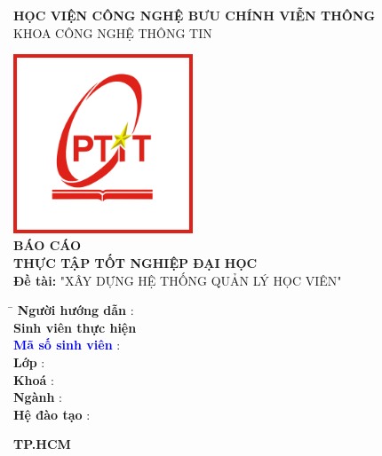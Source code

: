 \documentclass[report.tex]{subfiles}
\begin{document}
\begin{titlepage}

\begin{center}
    \textbf{HỌC VIỆN CÔNG NGHỆ BƯU CHÍNH VIỄN THÔNG}\\
    KHOA CÔNG NGHỆ THÔNG TIN\\
    \vspace{1cm}
    \vspace{-8pt}\hrulefill\raisebox{-2.1pt}\quad\decofourleft\decotwo\decofourright\quad\hrulefill

    \vspace{2cm}
    \centering\includegraphics[width=0.4\textwidth]{../meta/logo.PTIT.png}\\
    \vspace{2cm}
    \textbf{\Huge BÁO CÁO\\
        THỰC TẬP TỐT NGHIỆP ĐẠI HỌC}\\
    \vspace{1cm}
    \textbf{\Large Đề tài:} {\large "XÂY DỰNG HỆ THỐNG QUẢN LÝ HỌC VIÊN"} \\

    \vfill

    \begin{tabbing}
        \hspace{8cm} \= \hspace{10cm} \kill
        \textbf{Người hướng dẫn} \> :  \\
        \textbf{Sinh viên thực hiện} \> \\
        \textbf{\textcolor{blue}{Mã số sinh viên}} \> : \\
        \textbf{Lớp} \> : \\
        \textbf{Khoá} \> : \\
        \textbf{Ngành} \> : \\
        \textbf{Hệ đào tạo} \> : \\
    \end{tabbing}

\end{center}
\vfill
\begin{center}
    \textbf{TP.HCM}
\end{center}

\end{titlepage}
\end{document}
